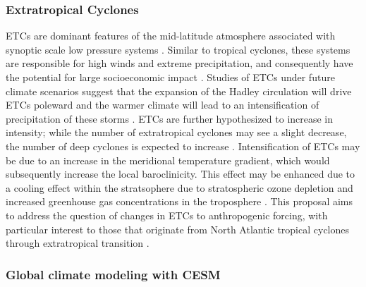 \documentclass[11pt]{article}
\begin{document}
\subsubsection{Extratropical Cyclones}

ETCs are dominant features of the mid-latitude atmosphere associated with synoptic scale low pressure systems \citep{serreze1995climatological}.  Similar to tropical cyclones, these systems are responsible for high winds and extreme precipitation, and consequently have the potential for large socioeconomic impact \citep{ulbrich2009extra}.  Studies of ETCs under future climate scenarios suggest that the expansion of the Hadley circulation will drive ETCs poleward \citep{bengtsson2006storm} and the warmer climate will lead to an intensification of precipitation of these storms \citep{bengtsson2009will, zappa2013multi}.  ETCs are further hypothesized to increase in intensity; while the number of extratropical cyclones may see a slight decrease, the number of deep cyclones is expected to increase \citep{ulbrich2009extra}. Intensification of ETCs may be due to an increase in the meridional temperature gradient, which would subsequently increase the local baroclinicity. This effect may be enhanced due to a cooling effect within the stratsophere due to stratospheric ozone depletion and increased greenhouse gas concentrations in the troposphere \citep{vose2014monitoring}.  This proposal aims to address the question of changes in ETCs to anthropogenic forcing, with particular interest to those that originate from North Atlantic tropical cyclones through extratropical transition \citep{hart2001climatology,evans2003}.  

\subsubsection{Global climate modeling with CESM} \label{sec:cesm-description}
\end{document}
